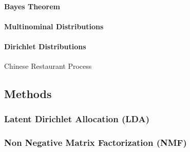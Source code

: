     \paragraph{Bayes Theorem}
    \paragraph{Multinominal Distributions}
    \paragraph{Dirichlet Distributions}
      Chinese Restaurant Process

  \subsection{Methods}
    \subsubsection{Latent Dirichlet Allocation (LDA)}
    \subsubsection{Non Negative Matrix Factorization (NMF)}


